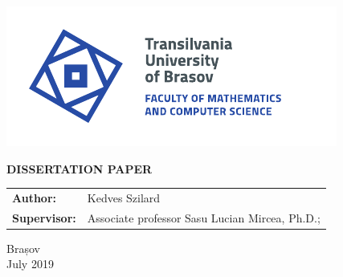 \begin{titlepage}
	
	\vspace*{-3cm}
	\hspace{-2cm}
	\includegraphics[width=0.8\linewidth]{./images/Logo-UT-MI-SPOT-EN}

	\begin{center}
		\Huge
		
		\vspace{2cm}
		
		\textbf{DISSERTATION PAPER}
		
		\vfill
				
		\Large
		\begin{tabular}{ll}
			\textbf{Author:}&Kedves Szilard\\
			\textbf{Supervisor:}&Associate professor Sasu Lucian Mircea, Ph.D.;
		\end{tabular}
		
		\vfill
		
		\Large
		Brașov\\
		July 2019
        
	\end{center}
\end{titlepage}